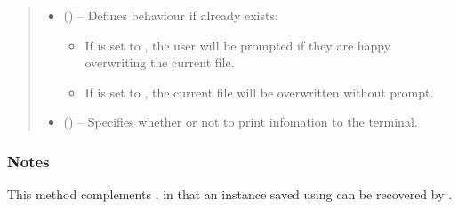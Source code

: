 \documentclass[letterpaper,10pt,english]{sphinxmanual}
\begin{document}
\begin{fulllineitems}
\begin{fulllineitems}
\begin{quote}
\begin{description}
\begin{itemize}
\item {} 
\sphinxAtStartPar
{} (\sphinxstyleliteralemphasis{\sphinxupquote{, }}) – 
\sphinxAtStartPar
Defines behaviour if  already exists:
\begin{itemize}
\item {} 
\sphinxAtStartPar
If  is set to , the user will be prompted
if they are happy overwriting the current file.

\item {} 
\sphinxAtStartPar
If  is set to , the current file will be
overwritten without prompt.

\end{itemize}


\item {} 
\sphinxAtStartPar
{} (\sphinxstyleliteralemphasis{\sphinxupquote{, }}) – Specifies whether or not to print infomation to the terminal.

\end{itemize}

\end{description}\end{quote}
\subsubsection*{Notes}

\sphinxAtStartPar
This method complements {\hyperref[\detokenize{references/core:nmrespy.core.Estimator.from_pickle}]{}}, in that
an instance saved using {\hyperref[\detokenize{references/core:nmrespy.core.Estimator.to_pickle}]{}} can be recovered by
.

\end{fulllineitems}



\end{fulllineitems}
\end{document}
